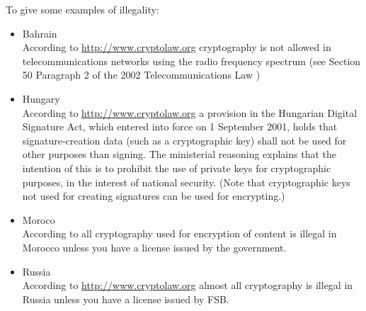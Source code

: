 To give some examples of illegality:
\begin{itemize}
\item Bahrain\\
According to \url{http://www.cryptolaw.org} cryptography is not allowed in telecommunications networks using the radio frequency spectrum (see Section 50 Paragraph 2 of the 2002 Telecommunications Law \cite{BAHRAIN})
\item Hungary\\
According to \url{http://www.cryptolaw.org} a provision in the Hungarian Digital Signature Act, which entered into force on 1 September 2001, holds that signature-creation data (such as a cryptographic key) shall not be used for other purposes than signing. The ministerial reasoning explains that the intention of this is to prohibit the use of private keys for cryptographic purposes, in the interest of national security. (Note that cryptographic keys not used for creating signatures can be used for encrypting.)
\item Moroco\\
According to \cite{MAROCO} all cryptography used for encryption of content is illegal in Morocco unless you have a license issued by the government.
\item Russia\\
According to \url{http://www.cryptolaw.org} almost all cryptography is illegal in  Russia unless you have a license issued by FSB.
\end{itemize}

